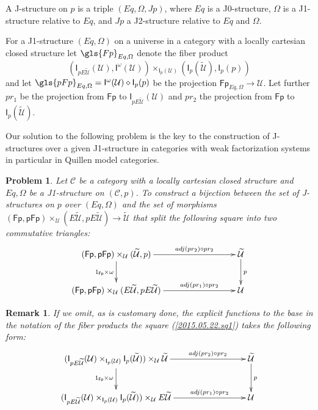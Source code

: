 \documentclass[12pt]{article}
\numberwithin{equation}{section}
\newenvironment{eq}{\begin{equation}}{\end{equation}}
\newtheorem{remark}[proposition]{Remark}
\newtheorem{problem}[proposition]{Problem}
\newcommand{\llabel}[1]{\label{#1}}
\newcommand{\sr}{\rightarrow}
\newcommand{\wt}{\widetilde}
\newcommand{\dd}{\diamond}
\newcommand{\C}{{\mathcal C}}  %
\newcommand{\id}{1}            %
\newcommand{\U}{\mathcal{U}}
\newcommand{\I}{\mathsf{I}}
\newcommand{\Fp}{\mathsf{Fp}}
\newcommand{\pFp}{\mathsf{pFp}}
\begin{document}
A J-structure on $p$ is a triple $(Eq,\Omega,Jp)$, where $Eq$ is a J0-structure,
$\Omega$ is a J1-structure relative to $Eq$, and $Jp$ a J2-structure relative to
$Eq$ and $\Omega$.

For a J1-structure $(Eq,\Omega)$ on a universe in a category with a locally
cartesian closed structure let $\gls{Fp}_{Eq,\Omega}$ denote the fiber product
%
$$(\I_{pE\wt{\U}}(\U), \I^{\omega}(\U)) \times_{\I_p(\U)} (\I_p(\wt{\U}), \I_p(p))$$
%
and let $\gls{pFp}_{Eq,\Omega}=\I^{\omega}(\U)\dd \I_p(p)$ be the projection
$\Fp_{Eq,\Omega}\sr \U$. Let further $pr_1$ be the projection from $\Fp$ to
$\I_{pE\wt{\U}}(\U)$ and $pr_2$ the projection from $\Fp$ to $\I_p(\wt{\U})$.

Our solution to the following problem is the key to the construction of
J-structures over a given J1-structure in categories with weak factorization
systems in particular in Quillen model categories.
%
\begin{problem}
\llabel{2015.05.12.l1} Let $\C$ be a category with a locally cartesian
closed structure and $Eq,\Omega$ be a J1-structure on $({\C},p)$. To
construct a bijection between the set of J-structures on $p$ over $(Eq,\Omega)$
and the set of morphisms $(\Fp,\pFp)\times_\U(E\wt{\U},pE\wt{\U})\sr \wt{\U}$ that
split the following square into two commutative triangles:
%
\begin{eq}\llabel{2015.05.22.sq1}
\begin{xy}
          \xymatrix@C=7pc{ (\Fp,\pFp)\times_\U(\wt{\U},p) \ar[r]^-{adj(pr_2)\circ
              pr_2} \ar[d]_{\id_{\Fp}\times \omega} & \wt{\U}
            \ar[d]^{p}\\ (\Fp,\pFp)\times_\U(E\wt{\U},pE\wt{\U})
            \ar[r]^-{adj(pr_1)\circ pr_2} & \U }
\end{xy}
\end{eq}%
%
\end{problem}
%
\begin{remark}\rm
If we omit, as is customary done, the explicit functions to the base in the
notation of the fiber products the square (\ref{2015.05.22.sq1}) takes the
following form:
%
\begin{eq}\llabel{2017.08.16.sq1}
\begin{xy}
          \xymatrix@C=7pc{ (\I_{pE\wt{\U}}(\U)\times_{\I_p(\U)}
            \I_p(\wt{\U}))\times_\U\wt{\U} \ar[r]^-{adj(pr_2)\circ pr_2}
            \ar[d]_{\id_{\Fp}\times \omega} & \wt{\U}
            \ar[d]^{p}\\ (\I_{pE\wt{\U}}(\U)\times_{\I_p(\U)} \I_p(\wt{\U}))\times_\U
            E\wt{\U} \ar[r]^-{adj(pr_1)\circ pr_2} & \U }
\end{xy}
\end{eq}%




\end{remark}
\end{document}
